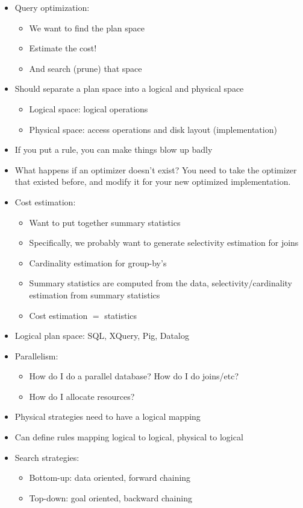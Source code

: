 \documentclass[10pt]{article}
\begin{document}
\begin{itemize}
\item Query optimization:
\begin{itemize}
\item We want to find the plan space
\item Estimate the cost!
\item And search (prune) that space
\end{itemize}
\item Should separate a plan space into a logical and physical space
\begin{itemize}
\item Logical space: logical operations
\item Physical space: access operations and disk layout (implementation)
\end{itemize}
\item If you put a rule, you can make things blow up badly
\item What happens if an optimizer doesn't exist? You need to take the optimizer that existed
before, and modify it for your new optimized implementation.
\item Cost estimation:
\begin{itemize}
\item Want to put together summary statistics
\item Specifically, we probably want to generate selectivity estimation for joins
\item Cardinality estimation for group-by's
\item Summary statistics are computed from the data, selectivity/cardinality estimation from summary
statistics
\item Cost estimation $=$ statistics
\end{itemize}
\item Logical plan space: SQL, XQuery, Pig, Datalog
\item Parallelism:
\begin{itemize}
\item How do I do a parallel database? How do I do joins/etc?
\item How do I allocate resources?
\end{itemize}
\item Physical strategies need to have a logical mapping
\item Can define rules mapping logical to logical, physical to logical
\item Search strategies:
\begin{itemize}
\item Bottom-up: data oriented, forward chaining
\item Top-down: goal oriented, backward chaining
\end{itemize}
\end{itemize}
\end{document}
